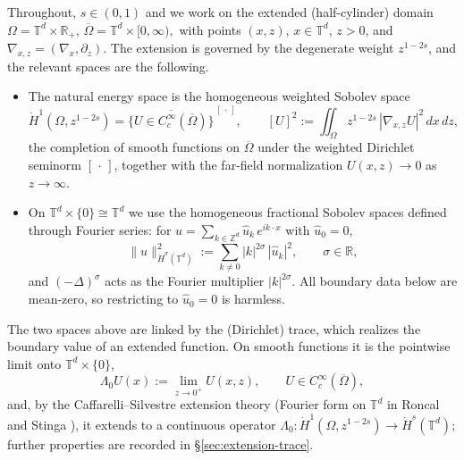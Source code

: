 \documentclass[12pt,a4paper,twoside]{article}
\newcommand{\Grad}{\nabla}
\numberwithin{equation}{section}%
\begin{document}
Throughout, $s \in (0,1)$ and we work on the extended (half-cylinder) domain $ \Omega = \mathbb{T}^d \times \mathbb{R}_+, \, \overline{\Omega} = \mathbb{T}^d \times [0,\infty),$
with points $(x,z)$, $x \in \mathbb{T}^d$, $z > 0$, and $\Grad_{x,z} = (\Grad_x, \partial_z)$. The
extension is governed by the degenerate weight $z^{1-2s}$, and the relevant spaces are the following.
\begin{itemize}[leftmargin=*]
	\item The natural energy space is the homogeneous weighted Sobolev space
	\begin{equation}\label{weighted-space}
		\dot{H}^1(\Omega, z^{1-2s})
		= \overline{\big\{ U \in C_c^\infty(\overline{\Omega}) \big\}}^{\,[\,\cdot\,]},
		\qquad
		[U]^2 := \iint_{\Omega} z^{1-2s}\, |\Grad_{x,z} U|^2 \,dx\,dz,
	\end{equation}
	the completion of smooth functions on $\overline{\Omega}$ under the weighted Dirichlet
	seminorm $[\,\cdot\,]$, together with the far-field normalization $U(x,z) \to 0$ as
	$z \to \infty$.
	
	\item  On $\mathbb{T}^d \times \{0\} \cong \mathbb{T}^d$ we use the homogeneous
	fractional Sobolev spaces defined through Fourier series: for
	$u = \sum_{k \in \mathbb{Z}^d} \hat u_k\, e^{ik\cdot x}$ with $\hat u_0 = 0$,
	\begin{equation}\label{frac-sobolev}
		\| u \|_{\dot{H}^{\sigma}(\mathbb{T}^d)}^2 := \sum_{k \neq 0} |k|^{2\sigma}\, |\hat u_k|^2,
		\qquad \sigma \in \mathbb{R},
	\end{equation}
	and $(-\Delta)^{\sigma}$ acts as the Fourier multiplier $|k|^{2\sigma}$. All boundary data below
	are mean-zero, so restricting to $\hat u_0 = 0$ is harmless.
\end{itemize}
The two spaces above are linked by the (Dirichlet) trace, which realizes the boundary value of an
extended function. On smooth functions it is the pointwise limit onto $\mathbb T^d\times\{0\}$,
\begin{equation}\label{trace-ext}
	\Lambda_0 U(x) := \lim_{z\to0^+} U(x,z), \qquad U \in C_c^\infty(\overline\Omega),
\end{equation}
and, by the Caffarelli--Silvestre extension theory \cite{CaS2007} (Fourier form on $\mathbb T^d$ in Roncal and Stinga \cite{RS2016}), it extends to a continuous operator
$\Lambda_0:\dot H^1(\Omega,z^{1-2s})\to\dot H^s(\mathbb T^d)$; further properties are recorded in
\S\ref{sec:extension-trace}.
\end{document}
